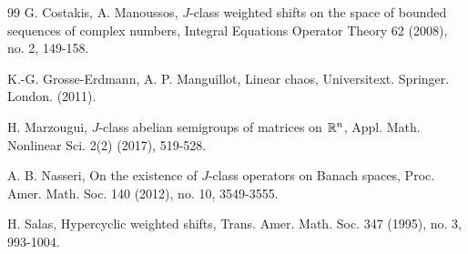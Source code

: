 \documentclass{amsart}
\theoremstyle{definition}\newtheorem{defn}[thm]{Definition}
\theoremstyle{remark}
\numberwithin{equation}{section}
\begin{document}
\begin{thebibliography}{99}
G. Costakis, A. Manoussos, $J$-class weighted shifts on the space of
bounded sequences of complex numbers, Integral Equations Operator
Theory 62 (2008), no. 2, 149-158.


K.-G. Grosse-Erdmann,  A. P. Manguillot, Linear chaos, Universitext.
Springer. London. (2011).






 H. Marzougui,  $J$-class abelian semigroups of matrices on $\Bbb{R}^{n}$,
 Appl. Math. Nonlinear Sci. 2(2) (2017),  519-528.


 A. B. Nasseri, On the existence of $J$-class operators on Banach spaces,
 Proc. Amer. Math. Soc. 140 (2012), no. 10, 3549-3555.



 H. Salas, Hypercyclic weighted shifts,
 Trans. Amer. Math. Soc. 347 (1995), no. 3, 993-1004.







\end{thebibliography}
\end{document}
